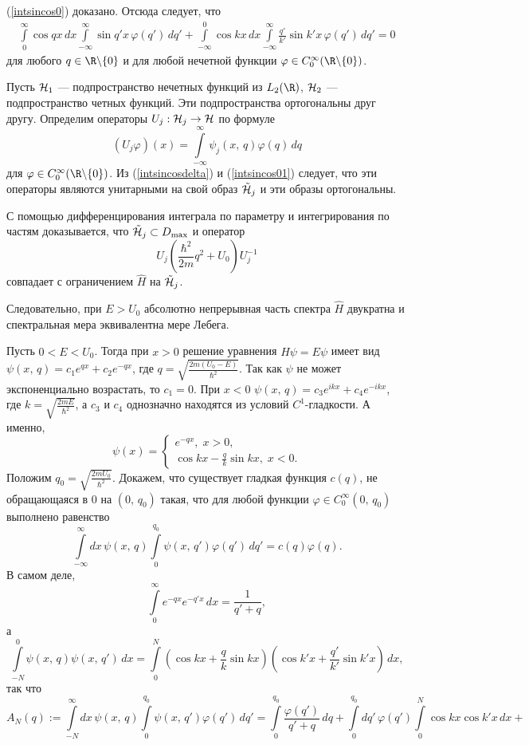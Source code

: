 \documentclass[a4paper
]{article}
\begin{document}
(\ref{intsincos0}) доказано. Отсюда следует, что
\begin{align}
\label{intsincos01}
\int\limits_0^\infty \cos qx\, dx\int\limits_{-\infty}^\infty
\sin q'x\, \varphi(q')\, dq'+\int \limits _{-\infty}^0\cos kx\, dx\int
\limits_{-\infty}^\infty \frac{q'}{k'}\sin k'x\, \varphi(q')\, dq'=0
\end{align}
для любого $q\in \R\backslash\{0\}$ и для любой нечетной функции
$\varphi\in C_0^\infty(\R\backslash\{0\})$. \par
Пусть ${\cal H}_1$ --- подпространство нечетных функций из $L_2(\R)$,
${\cal H}_2$ --- подпространство четных функций. Эти подпространства
ортогональны друг другу. Определим операторы $U_j:{\cal H}_j\rightarrow
{\cal H}$ по формуле $$(U_j\varphi)(x)=\int \limits_{-\infty}
^\infty \psi_j(x, \, q)\varphi(q)\, dq$$ для $\varphi\in C_0^\infty
(\R\backslash\{0\})$. Из (\ref{intsincosdelta}) и (\ref{intsincos01})
следует, что эти операторы являются унитарными на свой образ $\tilde{{\cal
H}}_j$ и эти образы ортогональны. \par
С помощью дифференцирования интеграла по параметру и интегрирования по частям
доказывается, что $\tilde {\cal H}_j\subset D_{\max}$ и оператор
$$U_j\left(\frac{\hbar^2}{2m}q^2+U_0\right)U_j^{-1}$$ совпадает
с ограничением $\hat H$ на $\tilde {\cal H}_j$. \par
Следовательно, при $E>U_0$ абсолютно непрерывная часть спектра $\hat H$
двукратна и спектральная мера эквивалентна мере Лебега. \par
Пусть $0<E<U_0$. Тогда при $x>0$ решение уравнения $\hat H\psi=E\psi$
имеет вид $\psi(x, \, q)=c_1e^{qx}+c_2e^{-qx}$, где $q=\sqrt{\frac{2m(U_0-E)}
{\hbar^2}}$. Так как $\psi$ не может экспоненциально возрастать, то
$c_1=0$. При $x<0$ $\psi(x, \, q)=c_3e^{ikx}+c_4e^{-ikx}$, где
$k=\sqrt{\frac{2mE}{\hbar^2}}$, а $c_3$ и $c_4$ однозначно находятся
из условий $C^1$-гладкости. А именно, $$\psi(x)=\left\{ \begin{array}{l}
e^{-qx},\; x>0, \\ \cos kx-\frac{q}{k}\sin kx, \; x<0.\end{array}
\right.$$ Положим $q_0=\sqrt{\frac{2mU_0}{\hbar^2}}$. Докажем, что
существует гладкая функция $c(q)$, не обращающаяся в 0 на $(0, \, q_0)$
такая, что для любой функции $\varphi \in C_0^\infty(0, \, q_0)$
выполнено равенство $$\int \limits_{-\infty}^\infty dx\, \psi(x, \, q)
\int \limits_0^{q_0}\psi(x, \, q')\varphi(q')\, dq'=c(q)\varphi(q).$$
В самом деле, $$\int \limits_0^\infty e^{-qx}e^{-q'x}\, dx=\frac{1}{q'+q},$$
а $$\int \limits_{-N}^0 \psi(x, \, q)\psi(x, \, q')\, dx=\int \limits_0^N
\left(\cos kx+\frac{q}{k}\sin kx\right)\left(\cos k'x+\frac{q'}{k'}
\sin k'x\right)\, dx,$$ так что $$A_N(q):=\int \limits_{-N}^\infty dx\,
\psi(x, \, q)\int \limits_0^{q_0}\psi(x, \, q')\varphi(q')\, dq'=
\int \limits_{0}^{q_0}\frac{\varphi(q')}{q'+q}\, dq+\int \limits
_0^{q_0}dq'\, \varphi(q')\int \limits_0^N \cos kx\cos k'x\, dx+$$
\end{document}
